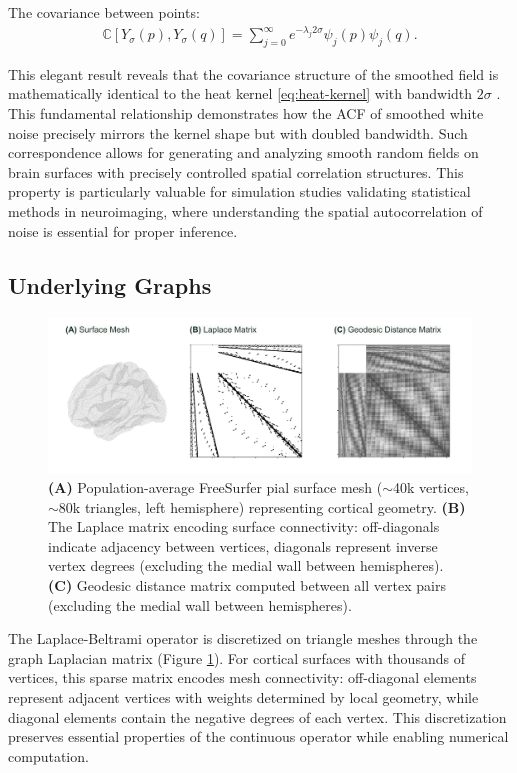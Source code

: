 \documentclass{article}
\begin{document}
The covariance between points:
\begin{align}\label{eq:cov}
    \mathbb{C}[Y_\sigma(p), Y_\sigma(q)] = \sum_{j=0}^\infty e^{-\lambda_j 2\sigma} \psi_j(p) \psi_j(q).
\end{align}

\noindent This elegant result reveals that the covariance structure of the smoothed field is mathematically identical to the heat kernel \eqref{eq:heat-kernel} with bandwidth $2\sigma$ \citep{chung_discrete_2018}. This fundamental relationship demonstrates how the ACF of smoothed white noise precisely mirrors the kernel shape but with doubled bandwidth. Such correspondence allows for generating and analyzing smooth random fields on brain surfaces with precisely controlled spatial correlation structures. This property is particularly valuable for simulation studies validating statistical methods in neuroimaging, where understanding the spatial autocorrelation of noise is essential for proper inference.

\subsection{Underlying Graphs}
\begin{figure}[H]
    \centering
    \includegraphics[width=0.9\linewidth]{project/figures/fig04.png}
    \caption{
    \textbf{(A)} Population-average FreeSurfer pial surface mesh ($\sim$40k vertices, $\sim$80k triangles, left hemisphere) representing cortical geometry. 
    \textbf{(B)} The Laplace matrix encoding surface connectivity: off-diagonals indicate adjacency between vertices, diagonals represent inverse vertex degrees (excluding the medial wall between hemispheres).
    \textbf{(C)} Geodesic distance matrix computed between all vertex pairs (excluding the medial wall between hemispheres).
    }
    \label{fig:surface-graphs}
\end{figure}

The Laplace-Beltrami operator is discretized on triangle meshes through the graph Laplacian matrix (Figure \ref{fig:surface-graphs}). For cortical surfaces with thousands of vertices, this sparse matrix encodes mesh connectivity: off-diagonal elements represent adjacent vertices with weights determined by local geometry, while diagonal elements contain the negative degrees of each vertex. This discretization preserves essential properties of the continuous operator while enabling numerical computation.\\
\end{document}
